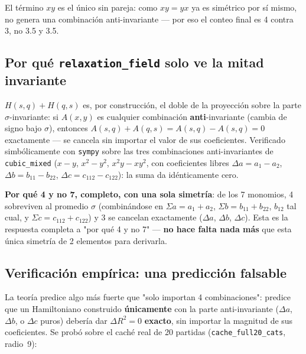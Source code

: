 \documentclass[11pt, a4paper]{article}
\begin{document}
El t\'ermino $xy$ es el \'unico sin pareja: como $xy=yx$ ya es
sim\'etrico por s\'i mismo, no genera una combinaci\'on
anti-invariante --- por eso el conteo final es 4 contra 3, no 3.5 y 3.5.

\subsection{Por qu\'e \texttt{relaxation\_field} solo ve la mitad invariante}

$H(s,q)+H(q,s)$ es, por construcci\'on, el doble de la proyecci\'on
sobre la parte $\sigma$-invariante: si $A(x,y)$ es cualquier
combinaci\'on \textbf{anti}-invariante (cambia de signo bajo $\sigma$),
entonces $A(s,q)+A(q,s) = A(s,q)-A(s,q) = 0$ exactamente --- se cancela
sin importar el valor de sus coeficientes. Verificado simb\'olicamente
con \texttt{sympy} sobre las tres combinaciones anti-invariantes de
\texttt{cubic\_mixed} ($x{-}y$, $x^2{-}y^2$, $x^2y{-}xy^2$, con
coeficientes libres $\Delta a=a_1{-}a_2$, $\Delta b=b_{11}{-}b_{22}$,
$\Delta c=c_{112}{-}c_{122}$): la suma da id\'enticamente cero.

\begin{tcolorbox}[quotebox]
  \textbf{Por qu\'e 4 y no 7, completo, con una sola simetr\'ia}: de
  los 7 monomios, 4 sobreviven al promedio $\sigma$ (combin\'andose en
  $\Sigma a=a_1{+}a_2$, $\Sigma b=b_{11}{+}b_{22}$, $b_{12}$ tal cual,
  y $\Sigma c=c_{112}{+}c_{122}$) y 3 se cancelan exactamente
  ($\Delta a$, $\Delta b$, $\Delta c$). Esta es la respuesta completa a
  "por qu\'e 4 y no 7" --- \textbf{no hace falta nada m\'as} que esta
  \'unica simetr\'ia de 2 elementos para derivarla.
\end{tcolorbox}

\subsection{Verificaci\'on emp\'irica: una predicci\'on falsable}

La teor\'ia predice algo m\'as fuerte que "solo importan 4
combinaciones": predice que un Hamiltoniano construido
\textbf{\'unicamente} con la parte anti-invariante ($\Delta a$,
$\Delta b$, o $\Delta c$ puros) deber\'ia dar $\Delta R^2=0$
\textbf{exacto}, sin importar la magnitud de sus coeficientes. Se
prob\'o sobre el cach\'e real de 20 partidas
(\texttt{cache\_full20\_cats}, radio~9):
\end{document}
